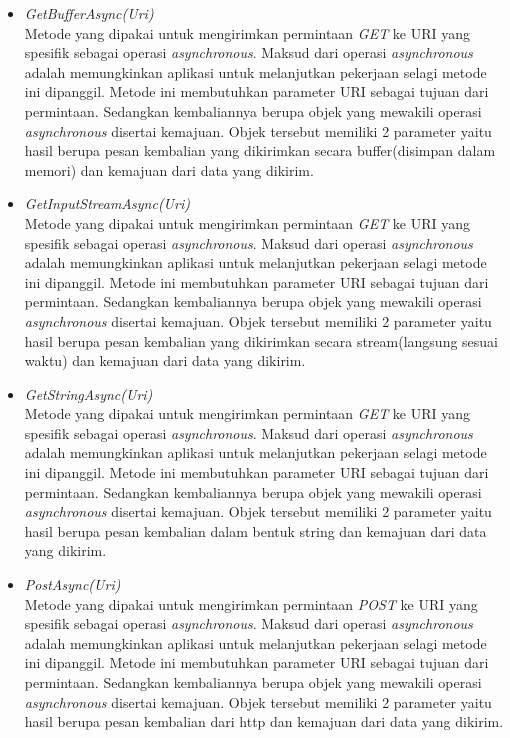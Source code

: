 \begin{itemize}
	\item \textit{GetBufferAsync(Uri)} \\
	Metode yang dipakai untuk mengirimkan permintaan \textit{GET} ke URI yang spesifik sebagai operasi \textit{asynchronous}. Maksud dari operasi \textit{asynchronous} adalah memungkinkan aplikasi untuk melanjutkan pekerjaan selagi metode ini dipanggil\footnotemark[2]. Metode ini membutuhkan parameter URI sebagai tujuan dari permintaan. Sedangkan kembaliannya berupa objek yang mewakili operasi \textit{asynchronous} disertai kemajuan. Objek tersebut memiliki 2 parameter yaitu hasil berupa pesan kembalian yang dikirimkan secara buffer(disimpan dalam memori) dan kemajuan dari data yang dikirim.
	\item \textit{GetInputStreamAsync(Uri)} \\
	Metode yang dipakai untuk mengirimkan permintaan \textit{GET} ke URI yang spesifik sebagai operasi \textit{asynchronous}. Maksud dari operasi \textit{asynchronous} adalah memungkinkan aplikasi untuk melanjutkan pekerjaan selagi metode ini dipanggil\footnotemark[2]. Metode ini membutuhkan parameter URI sebagai tujuan dari permintaan. Sedangkan kembaliannya berupa objek yang mewakili operasi \textit{asynchronous} disertai kemajuan. Objek tersebut memiliki 2 parameter yaitu hasil berupa pesan kembalian yang dikirimkan secara stream(langsung sesuai waktu) dan kemajuan dari data yang dikirim.
	\item \textit{GetStringAsync(Uri)} \\
	Metode yang dipakai untuk mengirimkan permintaan \textit{GET} ke URI yang spesifik sebagai operasi \textit{asynchronous}. Maksud dari operasi \textit{asynchronous} adalah memungkinkan aplikasi untuk melanjutkan pekerjaan selagi metode ini dipanggil\footnotemark[2]. Metode ini membutuhkan parameter URI sebagai tujuan dari permintaan. Sedangkan kembaliannya berupa objek yang mewakili operasi \textit{asynchronous} disertai kemajuan. Objek tersebut memiliki 2 parameter yaitu hasil berupa pesan kembalian dalam bentuk string dan kemajuan dari data yang dikirim.
	\item \textit{PostAsync(Uri)} \\
	Metode yang dipakai untuk mengirimkan permintaan \textit{POST} ke URI yang spesifik sebagai operasi \textit{asynchronous}. Maksud dari operasi \textit{asynchronous} adalah memungkinkan aplikasi untuk melanjutkan pekerjaan selagi metode ini dipanggil\footnotemark[2]. Metode ini membutuhkan parameter URI sebagai tujuan dari permintaan. Sedangkan kembaliannya berupa objek yang mewakili operasi \textit{asynchronous} disertai kemajuan. Objek tersebut memiliki 2 parameter yaitu hasil berupa pesan kembalian dari http dan kemajuan dari data yang dikirim.

\end{itemize}
